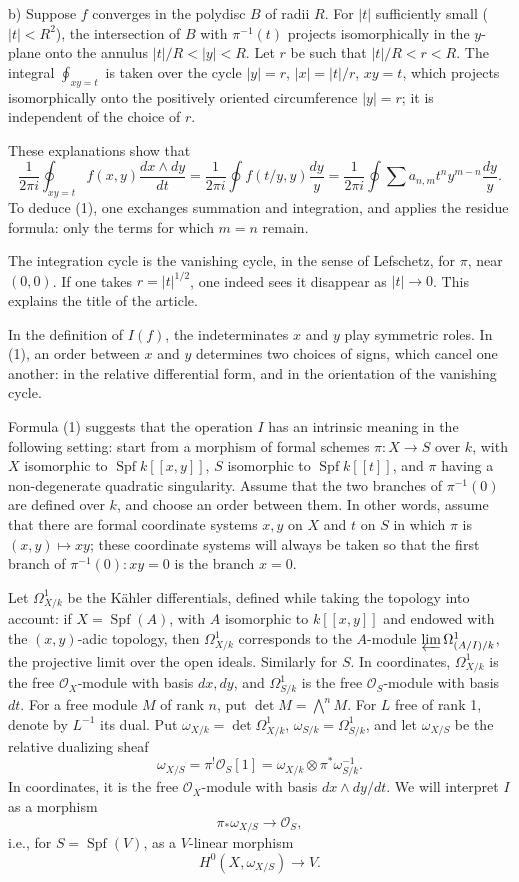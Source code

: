 \documentclass[11pt,leqno]{article}
\DeclareMathOperator{\Spf}{Spf}
\newcommand{\OO}{\mathcal O}
\begin{document}
\noindent b) Suppose $f$ converges in the polydisc $B$ of radii $R$. For $|t|$ sufficiently small ($|t|<R^2$), the intersection of $B$ with $\pi^{-1}(t)$ projects isomorphically in the $y$-plane onto the annulus $|t|/R<|y|<R$. Let $r$ be such that $|t|/R<r<R$. The integral $\oint_{xy=t}$ is taken over the cycle $|y|=r$, $|x|=|t|/r$, $xy=t$, which projects isomorphically onto the positively oriented circumference $|y|=r$; it is independent of the choice of $r$.

These explanations show that
\[
\frac{1}{2\pi i}\oint_{xy=t} f(x,y)\frac{dx\wedge dy}{dt}
=\frac{1}{2\pi i}\oint f(t/y,y)\frac{dy}{y}
=\frac{1}{2\pi i}\oint\sum a_{n,m}t^n y^{m-n}\frac{dy}{y}.
\]
To deduce (1), one exchanges summation and integration, and applies the residue formula: only the terms for which $m=n$ remain.

The integration cycle is the vanishing cycle, in the sense of Lefschetz, for $\pi$, near $(0,0)$. If one takes $r=|t|^{1/2}$, one indeed sees it disappear as $|t|\to0$. This explains the title of the article.

In the definition of $I(f)$, the indeterminates $x$ and $y$ play symmetric roles. In (1), an order between $x$ and $y$ determines two choices of signs, which cancel one another: in the relative differential form, and in the orientation of the vanishing cycle.

Formula (1) suggests that the operation $I$ has an intrinsic meaning in the following setting: start from a morphism of formal schemes $\pi:X\to S$ over $k$, with $X$ isomorphic to $\Spf k[[x,y]]$, $S$ isomorphic to $\Spf k[[t]]$, and $\pi$ having a non-degenerate quadratic singularity. Assume that the two branches of $\pi^{-1}(0)$ are defined over $k$, and choose an order between them. In other words, assume that there are formal coordinate systems $x,y$ on $X$ and $t$ on $S$ in which $\pi$ is $(x,y)\mapsto xy$; these coordinate systems will always be taken so that the first branch of $\pi^{-1}(0):xy=0$ is the branch $x=0$.

Let $\Omega^1_{X/k}$ be the Kähler differentials, defined while taking the topology into account: if $X=\Spf(A)$, with $A$ isomorphic to $k[[x,y]]$ and endowed with the $(x,y)$-adic topology, then $\Omega^1_{X/k}$ corresponds to the $A$-module $\varprojlim\Omega^1_{(A/I)/k}$, the projective limit over the open ideals. Similarly for $S$. In coordinates, $\Omega^1_{X/k}$ is the free $\OO_X$-module with basis $dx,dy$, and $\Omega^1_{S/k}$ is the free $\OO_S$-module with basis $dt$. For a free module $M$ of rank $n$, put $\det M=\bigwedge^nM$. For $L$ free of rank 1, denote by $L^{-1}$ its dual. Put $\omega_{X/k}=\det\Omega^1_{X/k}$, $\omega_{S/k}=\Omega^1_{S/k}$, and let $\omega_{X/S}$ be the relative dualizing sheaf
\[
        \omega_{X/S}=\pi^!\OO_S[1]=\omega_{X/k}\otimes\pi^*\omega_{S/k}^{-1}.
\]
\clearpage
In coordinates, it is the free $\OO_X$-module with basis $dx\wedge dy/dt$. We will interpret $I$ as a morphism
\[
        \pi_*\omega_{X/S}\longrightarrow\OO_S,
\]
i.e., for $S=\Spf(V)$, as a $V$-linear morphism
\[
        H^0(X,\omega_{X/S})\longrightarrow V.
\]
\end{document}
